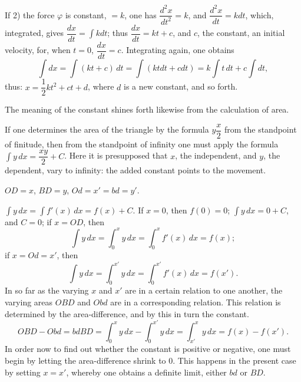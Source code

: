 \documentclass[12pt]{book}
\begin{document}
If 2) the force $\varphi$ is constant, $= k$, one has
$\dfrac{d^{2}x}{dt^{2}} = k$, and $\dfrac{d^{2}x}{dt} = kdt$, which,
integrated, gives $\dfrac{dx}{dt} = \int kdt$; thus
$\dfrac{dx}{dt} = kt + c$, and $c$, the constant, an initial velocity,
for, when $t = 0$, $\dfrac{dx}{dt} = c$. Integrating again, one obtains
\[
\int dx = \int (kt + c)\,dt = \int (ktdt + cdt)
  = k\int t\,dt + c\int dt,
\]
thus: $x = \dfrac{1}{2}kt^{2} + ct + d$, where $d$ is a new constant,
and so forth.

The meaning of the constant shines forth likewise from the calculation of area.

If one determines the area of the triangle by the formula $y\dfrac{x}{2}$ from
the standpoint of finitude, then from the standpoint of infinity one must
apply the formula $\int y\,dx = \dfrac{xy}{2} + C$. Here it is presupposed
that $x$, the independent, and $y$, the dependent, vary to
infinity: the added constant points to the movement.

\begin{center}

$OD = x$, $BD = y$, $Od = x' = bd = y'$.
\end{center}

$\int y\,dx = \int f'(x)\,dx = f(x) + C$. If $x = 0$, then
$f(0) = 0$; $\int y\,dx = 0 + C$, and $C = 0$; if $x = OD$, then
\[
\int y\,dx = \int_{0}^{x} y\,dx = \int_{0}^{x} f'(x)\,dx = f(x);
\]
if $x = Od = x'$, then
\[
\int y\,dx = \int_{0}^{x'} y\,dx = \int_{0}^{x'} f'(x)\,dx = f(x').
\]
In so far as the varying $x$ and $x'$ are in a certain relation to
one another, the varying areas $OBD$ and $Obd$ are in a corresponding
relation. This relation is determined by the area-difference, and by this
in turn the constant.
\[
OBD - Obd = bdBD = \int_{0}^{x} y\,dx - \int_{0}^{x'} y\,dx
  = \int_{x'}^{x} y\,dx = f(x) - f(x').
\]
In order now to find out whether the constant is positive or negative, one must
begin by letting the area-difference shrink to 0. This happens
in the present case by setting $x = x'$, whereby one obtains a
definite limit, either $bd$ or $BD$.
\end{document}
